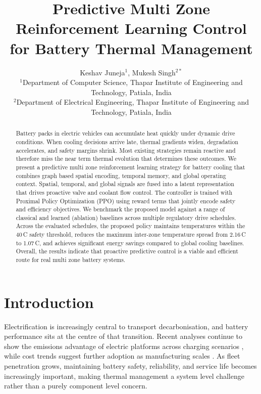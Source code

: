 \documentclass[twocolumn]{article}
\begin{document}
\title{Predictive Multi Zone Reinforcement Learning Control for Battery Thermal Management}

\author{Keshav Juneja$^{1}$, Mukesh Singh$^{2*}$\\
\small $^{1}$Department of Computer Science, Thapar Institute of Engineering and Technology, Patiala, India\\
\small $^{2}$Department of Electrical Engineering, Thapar Institute of Engineering and Technology, Patiala, India\\}

\maketitle

\begin{abstract}
Battery packs in electric vehicles can accumulate heat quickly under dynamic drive conditions. When cooling decisions arrive late, thermal gradients widen, degradation accelerates, and safety margins shrink. Most existing strategies remain reactive and therefore miss the near term thermal evolution that determines these outcomes. We present a predictive multi zone reinforcement learning strategy for battery cooling that combines graph based spatial encoding, temporal memory, and global operating context. Spatial, temporal, and global signals are fused into a latent representation that drives proactive valve and coolant flow control. The controller is trained with Proximal Policy Optimization (PPO) using reward terms that jointly encode safety and efficiency objectives. We benchmark the proposed model against a range of classical and learned (ablation) baselines across multiple regulatory drive schedules. Across the evaluated schedules, the proposed policy maintains temperatures within the 40\,\textdegree{}C safety threshold, reduces the maximum inter-zone temperature spread from 2.16\,\textdegree{}C to 1.07\,\textdegree{}C, and achieves significant energy savings compared to global cooling baselines. Overall, the results indicate that proactive predictive control is a viable and efficient route for real multi zone battery systems.
\end{abstract}

\section*{Introduction}

Electrification is increasingly central to transport decarbonisation, and battery performance sits at the centre of that transition. Recent analyses continue to show the emissions advantage of electric platforms across charging scenarios \cite{Welsby2021, Bersalli2023, LCA_EV2023}, while cost trends suggest further adoption as manufacturing scales \cite{Link2024}. As fleet penetration grows, maintaining battery safety, reliability, and service life becomes increasingly important, making thermal management a system level challenge rather than a purely component level concern.
\end{document}
